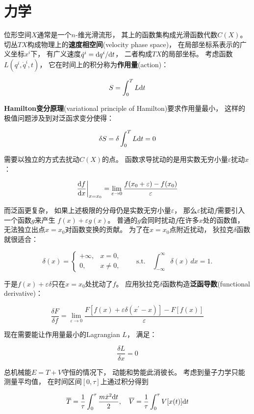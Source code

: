 \chapter{力学}

位形空间$X$通常是一个$n$-维光滑流形，
其上的函数集构成光滑函数代数$C(X)$。
切丛$TX$构成物理上的\textbf{速度相空间}(velocity phase space)，
在局部坐标系表示的广义坐标$x^i$下，
有广义速度$\dot q^i = \text d q^i / \text d t$，
二者构成$TX$的局部坐标。
考虑函数$L(q^i,\dot q^i,t)$，
它在时间上的积分称为\textbf{作用量}(action)：

$$
S = \int_0^T L \text d t
$$

\textbf{Hamilton变分原理}(variational principle of Hamilton)要求作用量最小，
这样的极值问题涉及到对泛函求变分使得：

$$
\delta S = \delta \int_0^T L \text d t = 0
$$

需要以独立的方式去扰动$C(X)$的点。
函数求导扰动的是用实数无穷小量$\varepsilon$扰动$x$：

$$
\frac{\text d f}{\text d x} \bigg|_{x = x_0}
= \lim_{\varepsilon \to 0}
\frac{f(x_0 + \varepsilon) - f(x_0)}{\varepsilon}
$$

而泛函更复杂，
如果上述极限的分母仍是实数无穷小量$\varepsilon$，
那么$\varepsilon$扰动$f$需要引入一个函数$g$来产生
$f(x) + \varepsilon g(x)$。
普通的$g$会同时扰动$f$在许多$x$处的函数值，
无法独立出点$x=x_0$对函数变换的贡献。
为了在$x = x_0$点附近扰动，
狄拉克$\delta$函数就很适合：

$$
\delta(x) = \begin{cases}
+\infty, & x=0,\\
0, & x\ne 0,
\end{cases}
\qquad \text{s.t.} \quad
\int_{-\infty}^{\infty}\delta(x)\,dx = 1.
$$

于是$f(x) + \varepsilon \delta$只在$x = x_0$处扰动了$f$。
应用狄拉克$\delta$函数构造\textbf{泛函导数}(functional derivative)：

$$
\frac{\delta F}{\delta f}
= \lim_{\varepsilon\to 0}
\frac{F[f(x)+\varepsilon\delta(x^\prime - x)]-F[f(x)]}{\varepsilon}
$$

现在需要能让作用量最小的Lagrangian $L$，
满足：

$$
\frac{\delta L}{\delta x} = 0
$$

总机械能$E = T + V$守恒的情况下，
动能和势能此消彼长。
考虑到量子力学只能测量平均值，
在时间区间$[0,\tau]$上通过积分得到

$$
\overline T = \frac{1}{\tau}\int_0^\tau \frac{m \dot x^2 \text d t}{2}, \quad 
\overline V = \frac{1}{\tau}\int_0^\tau V[x(t)] \text d t
$$

